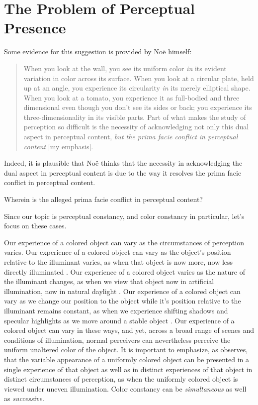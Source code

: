 \documentclass[12pt]{article}
\begin{document}

\section{The Problem of Perceptual Presence}\label{sec:conflicting_appearances} %

Some evidence for this suggestion is provided by Noë himself:
	\begin{quote}
		When you look at the wall, you see its uniform color \emph{in} its evident variation in color across its surface. When you look at a circular plate, held up at an angle, you experience its circularity \emph{in} its merely elliptical shape. When you look at a tomato, you experience it as full-bodied and three dimensional even though you don't see its sides or back; you experience its three-dimensionality in its visible parts. Part of what makes the study of perception so difficult is the necessity of acknowledging not only this dual aspect in perceptual content, \emph{but the prima facie conflict in perceptual content} [my emphasis]. \citep[166-167]{Noe:2004fk}
	\end{quote}
Indeed, it is plausible that Noë thinks that the necessity in acknowledging the dual aspect in perceptual content is due to the way it resolves the prima facie conflict in perceptual content.

Wherein is the alleged prima facie conflict in perceptual content?

Since our topic is perceptual constancy, and color constancy in particular, let's focus on these cases.

Our experience of a colored object can vary as the circumstances of perception varies. Our experience of a colored object can vary as the object's position relative to the illuminant varies, as when that object is now more, now less directly illuminated \citep[125]{Noe:2004fk}. Our experience of a colored object varies as the nature of the illuminant changes, as when we view that object now in artificial illumination, now in natural daylight \citep[125]{Noe:2004fk}. Our experience of a colored object can vary as we change our position to the object while it's position relative to the illuminant remains constant, as when we experience shifting shadows and specular highlights as we move around a stable object \citep[125]{Noe:2004fk}. Our experience of a colored object can vary in these ways, and yet, across a broad range of scenes and conditions of illumination, normal perceivers can nevertheless perceive the uniform unaltered color of the object. It is important to emphasize, as \citet[62-63]{Cohen:2008hc} observes, that the variable appearance of a uniformly colored object can be presented in a single experience of that object as well as in distinct experiences of that object in distinct circumstances of perception, as when the uniformly colored object is viewed under uneven illumination. Color constancy can be \emph{simultaneous} as well as \emph{successive}.
\end{document}
